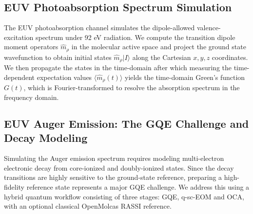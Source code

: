 \documentclass[11pt]{article}
\begin{document}
\subsection{EUV Photoabsorption Spectrum Simulation}
The EUV photoabsorption channel simulates the dipole-allowed valence-excitation spectrum under 92 eV radiation. We compute the transition dipole moment operators $\hat{m}_\rho$ in the molecular active space and project the ground state wavefunction to obtain initial states $\hat{m}_\rho |I\rangle$ along the Cartesian $x,y,z$ coordinates. We then propagate the states in the time-domain after which measuring the time-dependent expectation values $\langle\hat{m}_\rho(t)\rangle$ yields the time-domain Green's function $G(t)$, which is Fourier-transformed to resolve the absorption spectrum in the frequency domain.

\subsection{EUV Auger Emission: The GQE Challenge and Decay Modeling}
Simulating the Auger emission spectrum requires modeling multi-electron electronic decay from core-ionized and doubly-ionized states. Since the decay transitions are highly sensitive to the ground-state reference, preparing a high-fidelity reference state represents a major GQE challenge. We address this using a hybrid quantum workflow consisting of three stages: GQE, q-sc-EOM and OCA, with an optional classical OpenMolcas RASSI reference.
\end{document}
